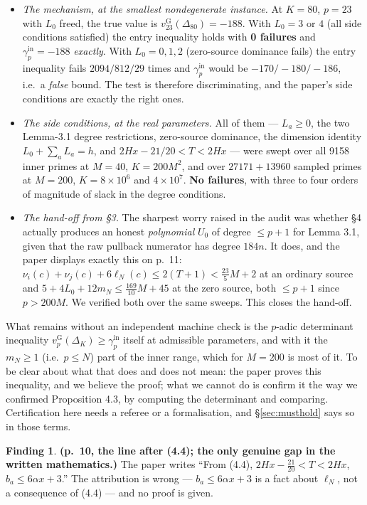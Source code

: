 \documentclass[11pt]{article}
\theoremstyle{definition}
\newtheorem{finding}{Finding}
\newcommand{\vG}{v_p^{\mathrm{G}}}
\newcommand{\gin}{\gamma_p^{\mathrm{in}}}
\begin{document}
\begin{itemize}
\item \emph{The mechanism, at the smallest nondegenerate instance.} At $K=80$, $p=23$ with $L_0$
freed, the true value is $v_{23}^{\mathrm{G}}(\Delta_{80})=-188$. With $L_0=3$ or $4$ (all side
conditions satisfied) the entry inequality holds with \textbf{0 failures} and $\gin=-188$
\emph{exactly}. With $L_0=0,1,2$ (zero-source dominance fails) the entry inequality fails
$2094/812/29$ times and $\gin$ would be $-170/-180/-186$, i.e.\ a \emph{false} bound. The test
is therefore discriminating, and the paper's side conditions are exactly the right ones.
\item \emph{The side conditions, at the real parameters.} All of them --- $L_a\ge0$, the two
Lemma-3.1 degree restrictions, zero-source dominance, the dimension identity
$L_0+\sum_aL_a=h$, and $2Hx-21/20<T<2Hx$ --- were swept over all 9158 inner primes at
$M=40$, $K=200M^2$, and over $27171+13960$ sampled primes at $M=200$, $K=8\times10^6$ and
$4\times10^7$. \textbf{No failures}, with three to four orders of magnitude of slack in the
degree conditions.
\item \emph{The hand-off from \S3.} The sharpest worry raised in the audit was whether \S4
actually produces an honest \emph{polynomial} $U_0$ of degree $\le p+1$ for Lemma 3.1, given
that the raw pullback numerator has degree $184n$. It does, and the paper displays exactly this
on p.~11: $\nu_i(c)+\nu_j(c)+6\ell_N(c)\le2(T+1)<\tfrac{23}{5}M+2$ at an ordinary source and
$5+4L_0+12m_N\le\tfrac{169}{10}M+45$ at the zero source, both $\le p+1$ since $p>200M$. We
verified both over the same sweeps. This closes the hand-off.
\end{itemize}

\noindent What remains without an independent machine check is the $p$-adic determinant
inequality $\vG(\Delta_K)\ge\gin$ itself at admissible parameters, and with it the $m_N\ge1$
(i.e.\ $p\le N$) part of the inner range, which for $M=200$ is most of it. To be clear about what
that does and does not mean: the paper proves this inequality, and we believe the proof; what we
cannot do is confirm it the way we confirmed Proposition 4.3, by computing the determinant and
comparing. Certification here needs a referee or a formalisation, and \S\ref{sec:musthold} says
so in those terms.

\begin{finding}\label{f:ba}
\textbf{(p.~10, the line after (4.4); the only genuine gap in the written mathematics.)}
The paper writes ``From (4.4), $2Hx-\tfrac{21}{20}<T<2Hx$, $b_a\le6\alpha x+3$.''
The attribution is wrong --- $b_a\le6\alpha x+3$ is a fact about $\ell_N$, not a consequence of
(4.4) --- and no proof is given.
\end{finding}
\end{document}
